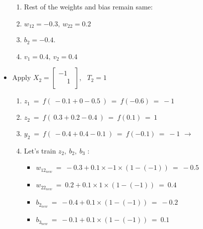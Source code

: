 \documentclass[12pt]{article}
\begin{document}
\begin{itemize}
{\begin{enumerate}
			\begin{itemize}[label=$\rightarrow$]
				\item $w_{11_{new}}  \ = \ -0.1 + 0.1 \times -1 \times (-1-1) \ = \ 0.1$
				\item $w_{21_{new}}  \ = \ -0.2 + 0.1 \times -1 \times (-1-1) \ = \ 0$
				\item $b_{1_{new}} \ = \ -0.3 + 0.1 \times (-1-1) \ = \ -0.5$
				\item $b_{3_{new}} \ = \ 0.1 + 0.1 \times (-1-1) \ = \ -0.1$
			\end{itemize}
			
			\item Rest of the weights and bias remain same: 
			\item $w_{12} = -0.3,\  w_{22} = 0.2$  
			\item $b_2 = -0.4$.
			\item $v_1 = 0.4, \ v_2 = 0.4$
			
		\end{enumerate}
		
	}

	\item Apply $X_2 = \begin{bmatrix}
		-1\ \\ 	
		\phantom{-}1\ \\ 	
	\end{bmatrix}$, \  $T_2 = 1$
	
	{	
		\begin{enumerate}
			\item $z_1 \ = \ f(\ -0.1  +  0 - 0.5 \ ) \ = \ f(-0.6) \ = \ -1$
			\item $z_2 \ = \ f(\ 0.3 + 0.2 - 0.4 \ ) \ = \ f(0.1) \ = \ 1$
			\item $y_2 \ = \ f (\ -0.4 + 0.4 - 0.1 \ )\ = \ f(-0.1)  \ = \ -1$ $\rightarrow$ 
			
			\item Let's train $z_2,\ b_2,\ b_3$ :
			
			\begin{itemize}[label=$\rightarrow$]
				\item $w_{12_{new}}  \ = \ -0.3 + 0.1 \times -1 \times (1-(-1)) \ = \ -0.5$
				\item $w_{22_{new}}  \ = \ 0.2 + 0.1 \times 1 \times (1-(-1)) \ = \ 0.4$
				\item $b_{2_{new}} \ = \ -0.4 + 0.1 \times (1-(-1)) \ = \ -0.2$
				\item $b_{3_{new}} \ = \ -0.1 + 0.1 \times (1-(-1)) \ = \ 0.1$
			\end{itemize}
			

\end{enumerate}}
\end{itemize}
\end{document}
